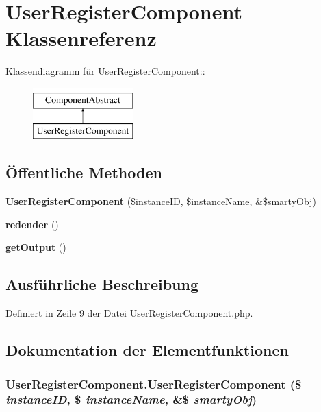 \section{UserRegisterComponent Klassenreferenz}
\label{classUserRegisterComponent}
Klassendiagramm für UserRegisterComponent::\begin{figure}[H]
\begin{center}
\leavevmode
\includegraphics[height=2cm]{classUserRegisterComponent}
\end{center}
\end{figure}
\subsection*{Öffentliche Methoden}
\begin{CompactItemize}
\item 
{\bf UserRegisterComponent} (\$instanceID, \$instanceName, \&\$smartyObj)
\item 
{\bf redender} ()
\item 
{\bf getOutput} ()
\end{CompactItemize}


\subsection{Ausführliche Beschreibung}


Definiert in Zeile 9 der Datei UserRegisterComponent.php.

\subsection{Dokumentation der Elementfunktionen}
\subsubsection{\setlength{\rightskip}{0pt plus 5cm}UserRegisterComponent.UserRegisterComponent (\$ {\em instanceID}, \$ {\em instanceName}, \&\$ {\em smartyObj})}\label{classUserRegisterComponent_944dfff60cd110cf8f294c06468ad128}




